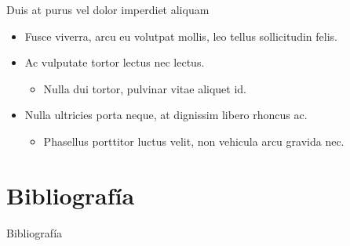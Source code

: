 \documentclass{beamer} %
\begin{document}
  \begin{frame}{Duis at purus vel dolor imperdiet aliquam}
    \begin{itemize}
      \item<1-2> Fusce viverra, arcu eu volutpat mollis, leo tellus sollicitudin felis.
      \item<2-5> Ac vulputate tortor lectus nec lectus.
      \begin{itemize}
	\item<3>  Nulla dui tortor, pulvinar vitae aliquet id.
      \end{itemize}
      \item<4-5> Nulla ultricies porta neque, at dignissim libero rhoncus ac.
      \begin{itemize}
	\item<5-> Phasellus porttitor luctus velit, non vehicula arcu gravida nec.
      \end{itemize}
    \end{itemize}
  \end{frame}

\section*{Bibliografía}
  \begin{frame}[allowframebreaks]{Bibliografía}
    \beamertemplatearticlebibitems
    
    
  \end{frame}

\end{document}
